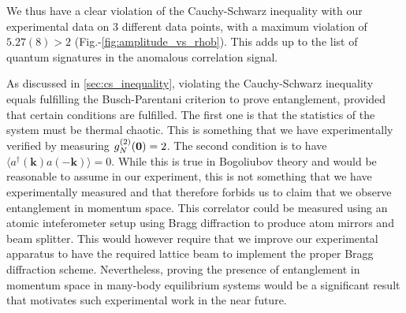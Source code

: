 We thus have a clear violation of the Cauchy-Schwarz inequality with our experimental data on 3 different data points, with a maximum violation of $5.27(8) > 2$ (Fig.-\ref{fig:amplitude_vs_rhob}). This adds up to the list of quantum signatures in the anomalous correlation signal.

As discussed in \ref{sec:cs_inequality}, violating the Cauchy-Schwarz inequality equals fulfilling the Busch-Parentani criterion to prove entanglement, provided that certain conditions are fulfilled. The first one is that the statistics of the system must be thermal chaotic. This is something that we have experimentally verified by measuring $g^{(2)}_N (\bm{0}) = 2$. The second condition is to have $\langle a^{\dagger}({\bm k}) a({-\bm k}) \rangle=0$. While this is true in Bogoliubov theory and would be reasonable to assume in our experiment, this is not something that we have experimentally measured and that therefore forbids us to claim that we observe entanglement in momentum space. This correlator could be measured using an atomic inteferometer setup \cite{dussarrat2017,kasevich1991atomic,lopes2015atomic} using Bragg diffraction \cite{martin1988bragg} to produce atom mirrors and beam splitter. This would however require that we improve our experimental apparatus to have the required lattice beam to implement the proper Bragg diffraction scheme. Nevertheless, proving the presence of entanglement in momentum space in many-body equilibrium systems would be a significant result that motivates such experimental work in the near future. 






